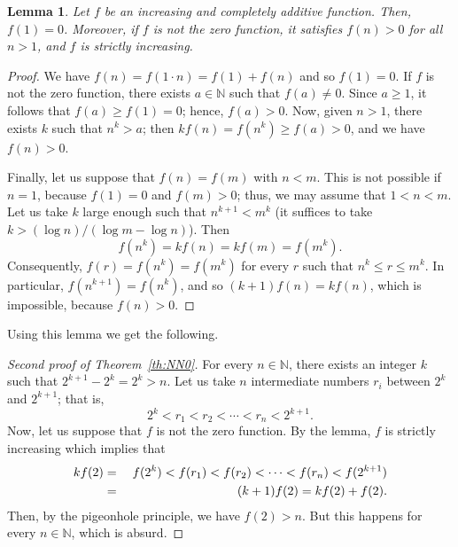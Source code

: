 \documentclass[12pt,a4paper]{amsart}
\newcommand{\N}{\mathbb{N}}
\newtheorem*{lemma}{Lemma}
\theoremstyle{remark}
\begin{document}
\begin{lemma}
Let $f$ be an increasing and completely additive function.
Then, $f(1) = 0$. Moreover, if $f$ is not the zero function, it satisfies
$f(n) > 0$ for all $n > 1$, and $f$ is strictly increasing.
\end{lemma}

\begin{proof}
We have $f(n) = f(1 \cdot n) = f(1) + f(n)$ and so $f(1) = 0$.
If $f$ is not the zero function, there exists $a \in \N$ 
such that $f(a) \ne 0$.  
Since $a \ge 1$, it follows that $f(a) \ge f(1) = 0$; hence, $f(a)>0$.
Now, given $n > 1$, there exists $k$ such that $n^k > a$; then
$k f(n) = f(n^k) \ge f(a) > 0$, and we have $f(n) > 0$.

Finally, let us suppose that $f(n) = f(m)$ with $n < m$.
This is not possible if $n = 1$, because $f(1) = 0$ and $f(m)>0$;
thus, we may assume that $1 < n < m$.
Let us take $k$ large enough such that $n^{k+1} < m^k$
(it suffices to take $k > (\log n) /(\log m - \log n)$).
Then
$$
  f(n^k) = kf(n) = kf(m) = f(m^k).
$$ 
Consequently, $f(r) = f(n^k) = f(m^k)$ for every $r$ such that 
$n^k \le r \le m^k$. In particular, $f(n^{k+1}) = f(n^k)$, and so
$(k+1)f(n) = kf(n)$, which is impossible, because $f(n) > 0$.
\end{proof}

Using this lemma we get the following.

\begin{proof}[Second proof of Theorem~\ref{th:NN0}]
For every $n \in \N$, there exists an integer $k$ such that 
$2^{k+1} - 2^k = 2^k > n$.
Let us take $n$ intermediate numbers $r_i$ between $2^k$ 
and $2^{k+1}$; that is,
$$
  2^k < r_1 < r_2 < \cdots < r_n < 2^{k+1}.
$$
Now, let us suppose that $f$ is not the zero function.
By the lemma, $f$ is strictly increasing which implies that
{%
\setlength\arraycolsep{0pt}
\begin{eqnarray*}
  k f(2) &\null=\null& f(2^k) < f(r_1) < f(r_2) < \cdots
  < f(r_n) < f(2^{k+1}) \\
  &\null=\null& (k+1) f(2) = k f(2) + f(2).
\end{eqnarray*}
}%
Then, by the pigeonhole principle, we have $f(2) > n$.
But this happens for every $n \in \N$, which is absurd.
\end{proof}
\end{document}
